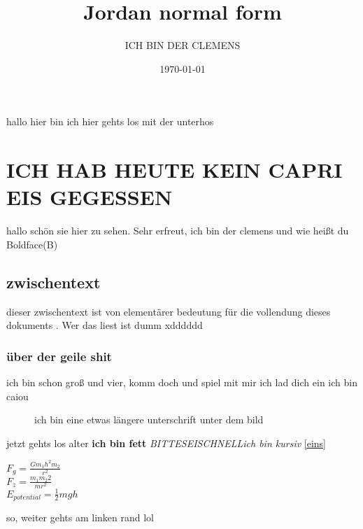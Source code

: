 \documentclass[a4paper]{scrartcl}
\title{Jordan normal form}
\author{ICH BIN DER CLEMENS}
\date{\today}
\begin{document}
	\maketitle
	\tableofcontents
	\newpage
	hallo hier bin ich
	hier gehts los mit der unterhos
		\section{ICH HAB HEUTE KEIN CAPRI EIS GEGESSEN}
			hallo schön sie hier zu sehen. Sehr erfreut, ich bin der clemens und wie heißt du
			Boldface(B)
			
			\subsection{zwischentext}
			dieser zwischentext ist von elementärer bedeutung für die vollendung dieses dokuments . Wer das liest ist dumm xdddddd
				\subsubsection{über der geile shit}
				ich bin schon groß und vier, komm doch und spiel mit mir ich lad dich ein ich bin\label{eins} caiou \vspace{40pt}
				
				\begin{figure}[h]
					\centering
					\caption[ich bin eine sehr kurze unterschrift von dem bild]{ich bin eine etwas längere unterschrift unter dem bild}
					\label{fig:wallpaper}
				\end{figure}
				\pagebreak
				
				jetzt gehts los alter \textbf{ich bin fett}
				\emph{BITTESEISCHNELL}\textit{ich bin kursiv}
				\ref{eins}
				\linebreak[3]
				\\ \begin{center} \huge ${F}_{g}=\frac{G{m}_{1}h^2{m}_{2}}{{r}^{2}}$
				\linebreak[5]
				\\ {\color{red}${F}_{z}=\frac{{m}_{1}{m}_{2}{2}}{{}{m r}^{2}}$}
				\linebreak[5]
				\\$E_{potential}=\frac{{1}}{2}mgh$
				\linebreak[10]
				
				\end{center}
			
			so, weiter gehts am linken rand lol
		
\end{document}
